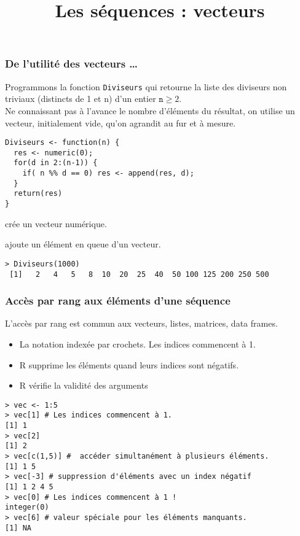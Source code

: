 \documentclass[10pt]{beamer}
\title{Les séquences : vecteurs}
\begin{document}
\maketitle




\begin{frame}[fragile]
  \frametitle{De l’utilité des vecteurs \dots}
  Programmons la fonction \texttt{Diviseurs} qui retourne la liste des diviseurs non triviaux (distincts de 1 et n) d'un entier $\mathtt{n} \geq 2$. \\
  Ne connaissant pas à l'avance le nombre d'éléments du résultat, on utilise un vecteur, initialement vide, qu'on agrandit au fur et à mesure.
  \begin{lstlisting}[style=editor]
Diviseurs <- function(n) {
  res <- numeric(0);
  for(d in 2:(n-1)) {
    if( n %% d == 0) res <- append(res, d);
  }
  return(res)
}    
\end{lstlisting}

\begin{description}
\item[\texttt{numeric}] crée un vecteur numérique. 
\item[\texttt{append}] ajoute un élément en queue d'un vecteur.
\end{description}
\begin{lstlisting}
> Diviseurs(1000)
 [1]   2   4   5   8  10  20  25  40  50 100 125 200 250 500  
\end{lstlisting}
\end{frame}

\begin{frame}[fragile]
  \frametitle{Accès par rang aux éléments d'une séquence}
  L'accès par rang est commun aux vecteurs, listes, matrices, data frames.\\
  \begin{itemize}
  \item \alert{La notation indexée par crochets. Les indices commencent à 1.}
  \item R supprime les éléments quand leurs indices sont négatifs.
  \item R vérifie la validité des arguments
  \end{itemize}

  
  \begin{lstlisting}
> vec <- 1:5
> vec[1] # Les indices commencent à 1.
[1] 1
> vec[2]
[1] 2
> vec[c(1,5)] #  accéder simultanément à plusieurs éléments.
[1] 1 5
> vec[-3] # suppression d'éléments avec un index négatif
[1] 1 2 4 5
> vec[0] # Les indices commencent à 1 !
integer(0)
> vec[6] # valeur spéciale pour les éléments manquants.
[1] NA   
\end{lstlisting}
\end{frame}
\end{document}
